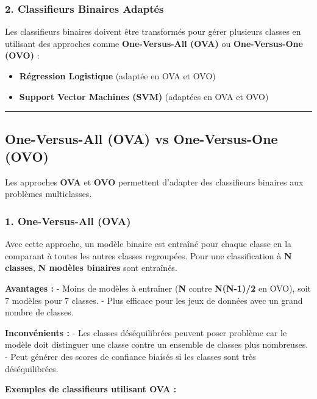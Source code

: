 \documentclass[
]{article}
\providecommand{\tightlist}{%
  \setlength{\itemsep}{0pt}\setlength{\parskip}{0pt}}\usepackage{longtable,booktabs,array}
\begin{document}
\subsubsection{2. Classifieurs Binaires
Adaptés}\label{classifieurs-binaires-adaptuxe9s}

Les classifieurs binaires doivent être transformés pour gérer plusieurs
classes en utilisant des approches comme \textbf{One-Versus-All (OVA)}
ou \textbf{One-Versus-One (OVO)} :

\begin{itemize}
\tightlist
\item
  \textbf{Régression Logistique} (adaptée en OVA et OVO)
\item
  \textbf{Support Vector Machines (SVM)} (adaptées en OVA et OVO)
\end{itemize}

\begin{center}\rule{0.5\linewidth}{0.5pt}\end{center}

\subsection{One-Versus-All (OVA) vs One-Versus-One
(OVO)}\label{one-versus-all-ova-vs-one-versus-one-ovo}

Les approches \textbf{OVA} et \textbf{OVO} permettent d'adapter des
classifieurs binaires aux problèmes multiclasses.

\subsubsection{1. One-Versus-All (OVA)}\label{one-versus-all-ova}

Avec cette approche, un modèle binaire est entraîné pour chaque classe
en la comparant à toutes les autres classes regroupées. Pour une
classification à \textbf{N classes}, \textbf{N modèles binaires} sont
entraînés.

\textbf{Avantages :} - Moins de modèles à entraîner (\textbf{N} contre
\textbf{N(N-1)/2} en OVO), soit 7 modèles pour 7 classes. - Plus
efficace pour les jeux de données avec un grand nombre de classes.

\textbf{Inconvénients :} - Les classes déséquilibrées peuvent poser
problème car le modèle doit distinguer une classe contre un ensemble de
classes plus nombreuses. - Peut générer des scores de confiance biaisés
si les classes sont très déséquilibrées.

\textbf{Exemples de classifieurs utilisant OVA :}
\end{document}
